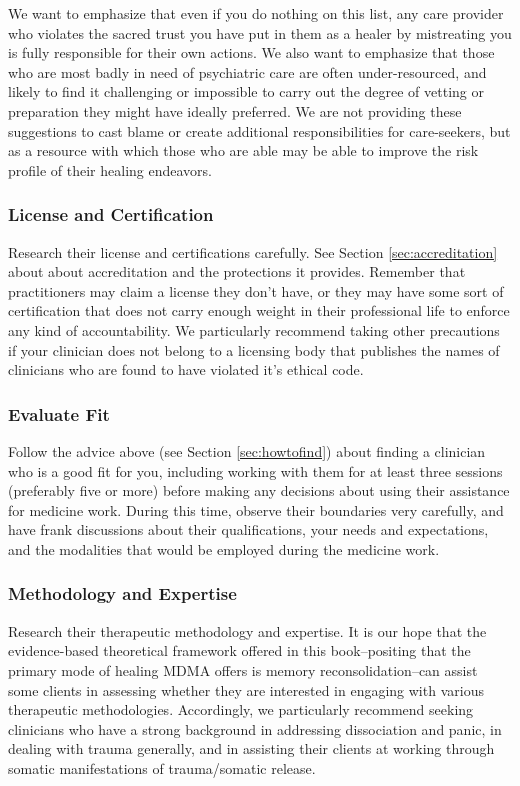\documentclass[12pt,letterpaper]{book}
\begin{document}
We want to emphasize that even if you do nothing on this list, any care provider who violates the sacred trust you have put in them as a healer by mistreating you is fully responsible for their own actions. We also want to emphasize that those who are most badly in need of psychiatric care are often under-resourced, and likely to find it challenging or impossible to carry out the degree of vetting or preparation they might have ideally preferred. We are not providing these suggestions to cast blame or create additional responsibilities for care-seekers, but as a resource with which those who are able may be able to improve the risk profile of their healing endeavors.

\subsubsection*{License and Certification}
Research their license and certifications carefully. See Section \ref{sec:accreditation} about about accreditation and the protections it provides. Remember that practitioners may claim a license they don't have, or they may have some sort of certification that does not carry enough weight in their professional life to enforce any kind of accountability. We particularly recommend taking other precautions if your clinician does not belong to a licensing body that publishes the names of clinicians who are found to have violated it's ethical code.

\subsubsection*{Evaluate Fit}
Follow the advice above (see Section \ref{sec:howtofind}) about finding a clinician who is a good fit for you, including working with them for at least three sessions (preferably five or more) before making any decisions about using their assistance for medicine work. During this time, observe their boundaries very carefully, and have frank discussions about their qualifications, your needs and expectations, and the modalities that would be employed during the medicine work.

\subsubsection*{Methodology and Expertise}
Research their therapeutic methodology and expertise.  It is our hope that the evidence-based theoretical framework offered in this book–positing that the primary mode of healing MDMA offers is memory reconsolidation–can assist some clients in assessing whether they are interested in engaging with various therapeutic methodologies. Accordingly, we particularly recommend seeking clinicians who have a strong background in addressing dissociation and panic, in dealing with trauma generally, and in assisting their clients at working through somatic manifestations of trauma/somatic release.
\end{document}

